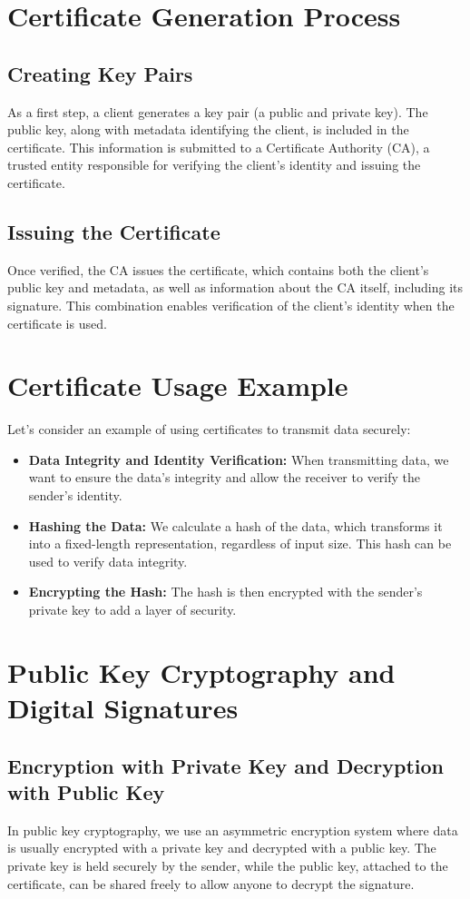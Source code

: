 \documentclass{article}
\begin{document}
\section{Certificate Generation Process}
\subsection{Creating Key Pairs}
As a first step, a client generates a key pair (a public and private key). The public key, along with metadata identifying the client, is included in the certificate. This information is submitted to a Certificate Authority (CA), a trusted entity responsible for verifying the client's identity and issuing the certificate.

\subsection{Issuing the Certificate}
Once verified, the CA issues the certificate, which contains both the client's public key and metadata, as well as information about the CA itself, including its signature. This combination enables verification of the client's identity when the certificate is used.

\section{Certificate Usage Example}
Let's consider an example of using certificates to transmit data securely:
\begin{itemize}
    \item \textbf{Data Integrity and Identity Verification:} When transmitting data, we want to ensure the data's integrity and allow the receiver to verify the sender's identity.
    \item \textbf{Hashing the Data:} We calculate a hash of the data, which transforms it into a fixed-length representation, regardless of input size. This hash can be used to verify data integrity.
    \item \textbf{Encrypting the Hash:} The hash is then encrypted with the sender's private key to add a layer of security.
\end{itemize}

\section{Public Key Cryptography and Digital Signatures}
\subsection{Encryption with Private Key and Decryption with Public Key}
In public key cryptography, we use an asymmetric encryption system where data is usually encrypted with a private key and decrypted with a public key. The private key is held securely by the sender, while the public key, attached to the certificate, can be shared freely to allow anyone to decrypt the signature.
\end{document}
